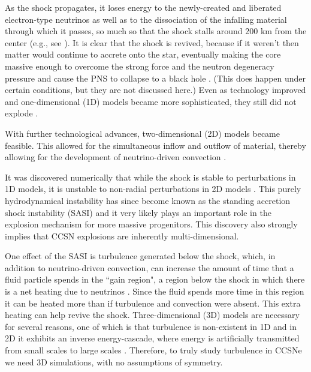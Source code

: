 As the shock propagates, it loses energy to the newly-created and liberated
electron-type neutrinos as well as to the dissociation of the
infalling material through which it passes,
so much so that the shock stalls around 200 km from the center
(e.g., see \citet{hm1981}).
It is clear that the shock is revived, because if it weren't then matter
would continue to accrete onto the star, eventually making the core massive
enough to overcome the strong force and the neutron degeneracy pressure
and cause the PNS to collapse
to a black hole \citep{bw1985}.
(This does happen under certain conditions, but they are not discussed here.)
Even as technology improved and one-dimensional (1D)
models became more sophisticated, they still did not explode
\citep[e.g., see][]{%
cj1960,
mw1966,
cw1966,
r1979,
hm1981,
bw1985,
mim1991,
mb1993,
mb1993a,
mb1993b,
rj2000,
mlm2001,
rj2002,
twi2003,
tbp2003,
lmm2004,
kjh2006,
sys2007,
zwh2008,
hmj2010,
thr2017,
sro2019,
bmo2021,
gmm2023%
}.

With further technological advances, two-dimensional (2D) models
became feasible.
This allowed for the simultaneous inflow and outflow of material,
thereby allowing for the development of neutrino-driven convection
\citep[e.g., see][]{%
hbc1992,
sys1993,
jm1995,
jm1995a,
mcb1998,
kpj2003,
kjh2006,
sjf2008,
fkh2011,
mm2011,
mjw2012,
tks2012,
mdb2013,
roa2016,
gmm2023%
}.

It was discovered numerically that while the shock is stable to
perturbations in 1D models, it is unstable to non-radial perturbations
in 2D models \citep{bmd2003}.
This purely hydrodynamical instability has since become known as the
standing accretion shock instability (SASI) and it very likely plays an
important role in the explosion mechanism for more massive progenitors.
This discovery also strongly implies that CCSN explosions are
inherently multi-dimensional.

One effect of the SASI is turbulence generated below the shock,
which, in addition to neutrino-driven convection,
can increase the amount of time that a fluid particle spends
in the ``gain region", a region below the shock in which there is a
net heating due to neutrinos \citep{co2015}.
Since the fluid spends more time in this region it can be heated more than if
turbulence and convection were absent.
This extra heating can help revive the shock.
Three-dimensional (3D) models are necessary for several reasons,
one of which is that turbulence is non-existent in 1D and in 2D it
exhibits an inverse energy-cascade, where energy is artificially transmitted
from small scales to large scales \citep{yem2017}.
Therefore, to truly study turbulence in CCSNe we need 3D simulations,
with no assumptions of symmetry.

